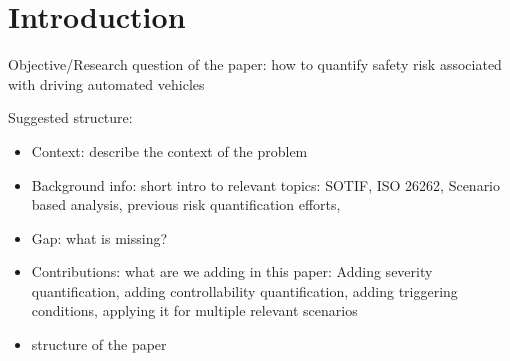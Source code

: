 \section{Introduction}
\label{sec:introduction}

Objective/Research question of the paper: how to quantify safety risk associated with driving automated vehicles 

Suggested structure: 
\begin{itemize}
    \item Context: describe the context of the problem
    \item Background info: short intro to relevant topics: SOTIF, ISO 26262, Scenario based analysis, previous risk quantification efforts, 
    \item Gap: what is missing?  
    \item Contributions: what are we adding in this paper: Adding severity quantification, adding controllability quantification, adding triggering conditions, applying it for multiple relevant scenarios
    \item structure of the paper
\end{itemize}

